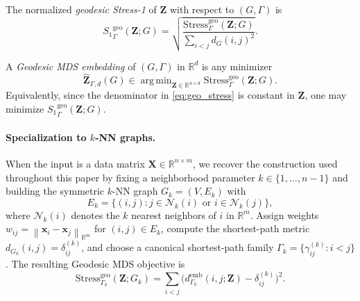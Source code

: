 \documentclass[twoside,11pt]{article}
\newcommand{\R}{\mathbb{R}}
\newcommand{\bx}{\mathbf{x}}
\newcommand{\bX}{\mathbf{X}}
\newcommand{\bZ}{\mathbf{Z}}
\newcommand{\norm}[1]{\left\|#1\right\|}
\newcommand{\demb}{d^{\mathrm{emb}}}
\newcommand{\Gk}{G_k}
\newcommand{\Stress}{\mathrm{Stress}}
\newcommand{\StressOne}{S_1}
\DeclareMathOperator*{\argmin}{arg\,min}
\begin{document}
\begin{definition}
  \label{def:geodesic_stress}
  The normalized \emph{geodesic Stress-1} of $\bZ$ with respect to
  $(G,\Gamma)$ is
  \begin{equation}
    {\StressOne}_{\Gamma}^{\mathrm{geo}}(\bZ; G)
    = \sqrt{
        \frac{\Stress^{\mathrm{geo}}_{\Gamma}(\bZ; G)}
             {\displaystyle\sum_{i < j} d_G(i,j)^2}
      }.
    \label{eq:geo_stress}
  \end{equation}
\end{definition}

\begin{definition}
  \label{def:gmds_embedding}
  A \emph{Geodesic MDS embedding} of $(G,\Gamma)$ in $\R^d$ is any
  minimizer
  \begin{equation}
    \hat{\bZ}_{\Gamma,d}(G)
    \in \argmin_{\bZ \in \R^{n \times d}}
    \Stress^{\mathrm{geo}}_{\Gamma}(\bZ; G).
    \label{eq:geo_mds}
  \end{equation}
  Equivalently, since the denominator in \cref{eq:geo_stress} is constant
  in $\bZ$, one may minimize ${\StressOne}_{\Gamma}^{\mathrm{geo}}(\bZ; G)$.
\end{definition}

\paragraph{Specialization to $k$-NN graphs.}
When the input is a data matrix $\bX \in \R^{n \times m}$, we recover the
construction used throughout this paper by fixing a neighborhood parameter
$k \in \{1,\ldots,n-1\}$ and building the symmetric $k$-NN graph
$\Gk = (V, E_k)$ with
\begin{equation}
  E_k = \{(i,j) : j \in \mathcal{N}_k(i) \text{ or } i \in \mathcal{N}_k(j)\},
  \label{eq:knn_edges}
\end{equation}
where $\mathcal{N}_k(i)$ denotes the $k$ nearest neighbors of $i$ in
$\R^m$.  Assign weights $w_{ij} = \norm{\bx_i - \bx_j}_{\R^m}$ for
$(i,j) \in E_k$, compute the shortest-path metric
$d_{\Gk}(i,j) = \delta_{ij}^{(k)}$, and choose a canonical shortest-path
family $\Gamma_k = \{\gamma_{ij}^{(k)} : i < j\}$.  The resulting Geodesic
MDS objective is
\begin{equation}
  \Stress^{\mathrm{geo}}_{\Gamma_k}(\bZ; \Gk)
  = \sum_{i < j}
    \bigl(\demb_{\Gamma_k}(i,j;\bZ) - \delta^{(k)}_{ij}\bigr)^2.
  \label{eq:knn_raw_geo_stress}
\end{equation}
\end{document}

